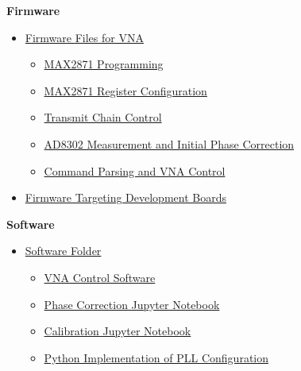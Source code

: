\textbf{Firmware}
\begin{itemize}
	\item \href{https://github.com/joshajohnson/vna/tree/master/Firmware/VNA}{Firmware Files for VNA} 
	\begin{itemize}
		\item \href{https://github.com/joshajohnson/vna/blob/master/Firmware/VNA/Src/max2871.c}{MAX2871 Programming}
		\item
		\href{https://github.com/joshajohnson/vna/blob/master/Firmware/VNA/Src/max2871_registers.c}{MAX2871 Register Configuration}
		\item
		\href{https://github.com/joshajohnson/vna/blob/master/Firmware/VNA/Src/txChain.c}{Transmit Chain Control}
		\item
		\href{https://github.com/joshajohnson/vna/blob/master/Firmware/VNA/Src/receiver.c}{AD8302 Measurement and Initial Phase Correction}
		\item
		\href{https://github.com/joshajohnson/vna/blob/master/Firmware/VNA/Src/commandParser.c}{Command Parsing and VNA Control}
	\end{itemize}
	\item \href{https://github.com/joshajohnson/vna/tree/master/Firmware/DevBoards}{Firmware Targeting Development Boards}\\
\end{itemize}


\textbf{Software}
\begin{itemize}
	\item \href{https://github.com/joshajohnson/vna/tree/master/Software/vna}{Software Folder}
	\begin{itemize}
		\item \href{https://github.com/joshajohnson/vna/blob/master/Software/vna/vna.py}{VNA Control Software}
		\item \href{https://github.com/joshajohnson/vna/blob/master/Software/vna/phase_correction.ipynb}{Phase Correction Jupyter Notebook}
		\item \href{https://github.com/joshajohnson/vna/blob/master/Software/vna/calibration.ipynb}{Calibration Jupyter Notebook}
		\item \href{https://github.com/joshajohnson/vna/blob/master/Firmware/DevBoards/freqGen.py}{Python Implementation of PLL Configuration}
	\end{itemize}
\end{itemize}



